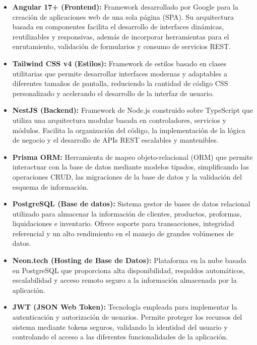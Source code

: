 \begin{itemize}

\item \textbf{Angular 17+ (Frontend):} Framework desarrollado por Google para la creación de aplicaciones web de una sola página (SPA). Su arquitectura basada en componentes facilita el desarrollo de interfaces dinámicas, reutilizables y responsivas, además de incorporar herramientas para el enrutamiento, validación de formularios y consumo de servicios REST.

\item \textbf{Tailwind CSS v4 (Estilos):} Framework de estilos basado en clases utilitarias que permite desarrollar interfaces modernas y adaptables a diferentes tamaños de pantalla, reduciendo la cantidad de código CSS personalizado y acelerando el desarrollo de la interfaz de usuario.

\item \textbf{NestJS (Backend):} Framework de Node.js construido sobre TypeScript que utiliza una arquitectura modular basada en controladores, servicios y módulos. Facilita la organización del código, la implementación de la lógica de negocio y el desarrollo de APIs REST escalables y mantenibles.

\item \textbf{Prisma ORM:} Herramienta de mapeo objeto-relacional (ORM) que permite interactuar con la base de datos mediante modelos tipados, simplificando las operaciones CRUD, las migraciones de la base de datos y la validación del esquema de información.

\item \textbf{PostgreSQL (Base de datos):} Sistema gestor de bases de datos relacional utilizado para almacenar la información de clientes, productos, proformas, liquidaciones e inventario. Ofrece soporte para transacciones, integridad referencial y un alto rendimiento en el manejo de grandes volúmenes de datos.

\item \textbf{Neon.tech (Hosting de Base de Datos):} Plataforma en la nube basada en PostgreSQL que proporciona alta disponibilidad, respaldos automáticos, escalabilidad y acceso remoto seguro a la información almacenada por la aplicación.

\item \textbf{JWT (JSON Web Token):} Tecnología empleada para implementar la autenticación y autorización de usuarios. Permite proteger los recursos del sistema mediante tokens seguros, validando la identidad del usuario y controlando el acceso a las diferentes funcionalidades de la aplicación.


\end{itemize}
